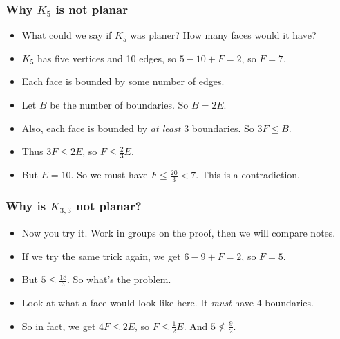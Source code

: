 \subsubsection*{Why $K_5$ is not planar}
\begin{itemize}
  \item What could we say if $K_5$ was planer?  How many faces would it have?
  \item $K_5$ has five vertices and 10 edges, so $5 - 10 + F = 2$, so $F = 7$.
  \item Each face is bounded by some number of edges.
 \item Let $B$ be the number of boundaries.  So $B = 2E$.
 \item Also, each face is bounded by {\em at least} 3 boundaries.  So $3F \le B$.
 \item Thus $3F \le 2E$, so $F \le \frac{2}{3}E$.
 \item But $E = 10$.  So we must have $F \le \frac{20}{3} < 7$.  This is a contradiction.
\end{itemize}

\subsubsection*{Why is $K_{3,3}$ not planar?}
\begin{itemize}
\item Now you try it.  Work in groups on the proof, then we will compare notes.
 \item If we try the same trick again, we get $6 - 9 + F = 2$, so $F = 5$.  
 \item But $5 \le \frac{18}{3}$.  So what's the problem.
 \item Look at what a face would look like here.  It {\em must} have 4 boundaries.
 \item So in fact, we get $4F \le 2E$, so $F \le \frac{1}{2}E$.  And $5 \not\le \frac{9}{2}$.
\end{itemize}

